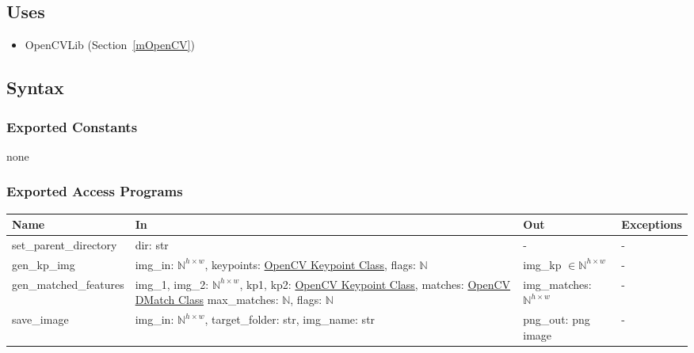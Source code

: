 \documentclass[12pt, titlepage]{article}
\begin{document}
\subsection{Uses}
\begin{itemize}
  \item OpenCVLib (Section~\ref{mOpenCV})
\end{itemize}

\subsection{Syntax}
\subsubsection{Exported Constants}
none 

\subsubsection{Exported Access Programs}
\begin{center}
\begin{tabular}{p{4cm} p{5cm} p{4cm} p{2cm}}
\hline
\textbf{Name} & \textbf{In} & \textbf{Out} & \textbf{Exceptions} \\
\hline
set\_parent\_directory
& dir: str
& -
& - \\
\hline
gen\_kp\_img 
& img\_in: $\mathbb{N}^{h \times w}$, \newline
keypoints: \href{https://docs.opencv.org/3.4/d2/d29/classcv_1_1KeyPoint.html}{OpenCV Keypoint Class}, \newline
flags: $\mathbb{N}$ & img\_kp $\in \mathbb{N}^{h \times w}$ & - \\
\hline
gen\_matched\_features 
& img\_1, img\_2: $\mathbb{N}^{h \times w}$, \newline
kp1, kp2: \href{https://docs.opencv.org/3.4/d2/d29/classcv_1_1KeyPoint.html}{OpenCV Keypoint Class}, \newline
matches: \href{https://docs.opencv.org/3.4/d4/de0/classcv_1_1DMatch.html}{OpenCV DMatch Class} \newline
max\_matches: $\mathbb{N}$, \newline
flags: $\mathbb{N}$
& img\_matches: $\mathbb{N}^{h \times w}$ & - \\
\hline
save\_image
& img\_in: $\mathbb{N}^{h \times w}$, \newline
target\_folder: str, \newline
img\_name: str
& png\_out: png image
& - \\
\hline
\end{tabular}
\end{center}
\end{document}
